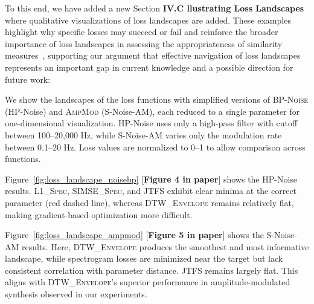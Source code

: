 \documentclass[11pt]{article}
\newcommand{\BPNoise}{\textsc{BP-Noise}}
\newcommand{\AmpMod}{\textsc{AmpMod}}
\newcommand{\DTWEnv}{\textsc{DTW\_Envelope}}
\newcommand{\SIMSESpec}{\textsc{SIMSE\_Spec}}
\newcommand{\LoneSpec}{\textsc{L1\_Spec}}
\newcommand{\JTFS}{\textsc{JTFS}}
\begin{document}
To this end, we have added a new Section \textbf{IV.C llustrating Loss Landscapes} where qualitative visualizations of loss landscapes  are added. These examples highlight why specific losses may succeed or fail and reinforce the broader importance of loss landscapes in assessing the appropriateness of similarity measures~\cite{vahidi2023mesostructures,turian2020sorry}, supporting our argument that effective navigation of loss landscapes represents an important gap in current knowledge and a possible direction for future work:


\begin{displayquote}
We show the landscapes of the loss functions with simplified versions of \BPNoise{} (HP-Noise) and \AmpMod{} (S-Noise-AM), each reduced to a single parameter for one-dimensional visualization. HP-Noise uses only a high-pass filter with cutoff between 100–20,000 Hz, while S-Noise-AM varies only the modulation rate between 0.1–20 Hz. Loss values are normalized to 0–1 to allow comparison across functions.

    Figure~\ref{fig:loss_landscape_noisebp} [\textbf{Figure 4 in paper}] shows the HP-Noise results. \LoneSpec{}, \SIMSESpec{}, and \JTFS{} exhibit clear minima at the correct parameter (red dashed line), whereas \DTWEnv{} remains relatively flat, making gradient-based optimization more difficult.

    Figure~\ref{fig:loss_landscape_ampmod} [\textbf{Figure 5 in paper}]  shows the S-Noise-AM results. Here, \DTWEnv{} produces the smoothest and most informative landscape, while spectrogram losses are minimized near the target but lack consistent correlation with parameter distance. \JTFS{} remains largely flat. This aligns with \DTWEnv's superior performance in amplitude-modulated synthesis observed in our experiments.
\end{displayquote}
\end{document}
